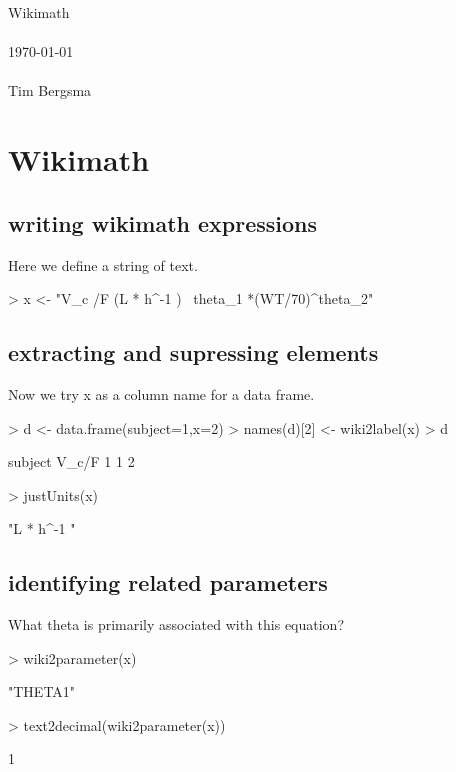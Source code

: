 \documentclass[titlepage]{article}
\begin{document}
\vspace*{2cm}
\begin{center}
\vspace{1.5cm}
{\Large Wikimath}\\
~\\
\today\\
~\\
Tim Bergsma\\
\end{center}
\newpage

\section*{Wikimath}
\subsection{writing wikimath expressions}
Here we define a string of text.
\begin{Schunk}
\begin{Sinput}
> x <- "V_c /F (L * h^-1 ) ~theta_1 *(WT/70)^theta_2"
\end{Sinput}
\end{Schunk}
\subsection{extracting and supressing elements}
Now we try x as a column name for a data frame.
\begin{Schunk}
\begin{Sinput}
> d <- data.frame(subject=1,x=2)
> names(d)[2] <- wiki2label(x)
> d
\end{Sinput}
\begin{Soutput}
  subject V_c/F
1       1     2
\end{Soutput}
\begin{Sinput}
> justUnits(x)
\end{Sinput}
\begin{Soutput}
[1] "L * h^-1 "
\end{Soutput}
\end{Schunk}
\subsection{identifying related parameters}
What theta is primarily associated with this equation?
\begin{Schunk}
\begin{Sinput}
> wiki2parameter(x)
\end{Sinput}
\begin{Soutput}
[1] "THETA1"
\end{Soutput}
\begin{Sinput}
> text2decimal(wiki2parameter(x))
\end{Sinput}
\begin{Soutput}
[1] 1
\end{Soutput}
\end{Schunk}
\end{document}
